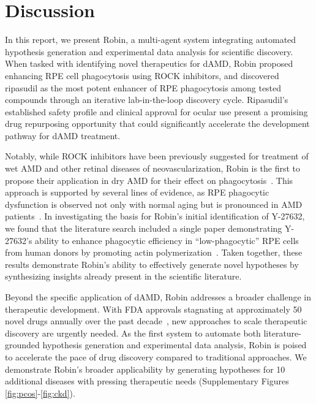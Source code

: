 \documentclass{article}
\begin{document}
\section{Discussion}

In this report, we present Robin, a multi-agent system integrating automated hypothesis generation and experimental data analysis for scientific discovery. When tasked with identifying novel therapeutics for dAMD, Robin proposed enhancing RPE cell phagocytosis using ROCK inhibitors, and discovered ripasudil as the most potent enhancer of RPE phagocytosis among tested compounds through an iterative lab-in-the-loop discovery cycle. Ripasudil's established safety profile and clinical approval for ocular use present a promising drug repurposing opportunity that could significantly accelerate the development pathway for dAMD treatment.

Notably, while ROCK inhibitors have been previously suggested for treatment of wet AMD and other retinal diseases of neovascularization, Robin is the first to propose their application in dry AMD for their effect on phagocytosis~\cite{Halasz_Townes-Anderson_2016}. This approach is supported by several lines of evidence, as RPE phagocytic dysfunction is observed not only with normal aging but is pronounced in AMD patients~\cite{inana_rpe_2018, si_role_2023, kaarniranta_autophagy_2013}. In investigating the basis for Robin’s initial identification of Y-27632, we found that the literature search included a single paper demonstrating Y-27632’s ability to enhance phagocytic efficiency in “low-phagocytic” RPE cells from human donors by promoting actin polymerization~\cite{si_role_2023}. Taken together, these results demonstrate Robin's ability to effectively generate novel hypotheses by synthesizing insights already present in the scientific literature.

Beyond the specific application of dAMD, Robin addresses a broader challenge in therapeutic development. With FDA approvals stagnating at approximately 50 novel drugs annually over the past decade~\cite{baedeker_2024_2025}, new approaches to scale therapeutic discovery are urgently needed. As the first system to automate both literature-grounded hypothesis generation and experimental data analysis, Robin is poised to accelerate the pace of drug discovery compared to traditional approaches. We demonstrate Robin's broader applicability by generating hypotheses for 10 additional diseases with pressing therapeutic needs (Supplementary Figures \ref{fig:pcos}-\ref{fig:ckd}). 
\end{document}

